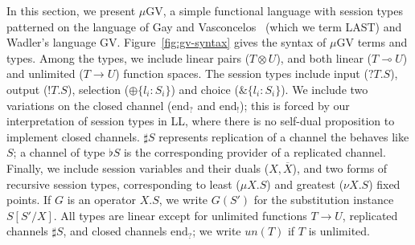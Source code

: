 \documentclass[orivec,envcountsame]{llncs}
\newcommand{\with}{\mathbin\binampersand}
\newcommand{\gvdual}[1]{\overline{#1}}
\newcommand{\gvout}[2]{{!#1.#2}}
\newcommand{\gvin}[2]{{?#1.#2}}
\newcommand{\lto}{\ensuremath{\multimap}}
\newcommand{\uto}{\ensuremath{\rightarrow}}
\newcommand{\outterm}{\mathrm{end}_!}
\newcommand{\interm}{\mathrm{end}_?}
\newcommand{\gvserver}[1]{\flat #1}
\newcommand{\gvservice}[1]{\sharp #1}
\newcommand{\mugv}{$\mu\mathrm{GV}$\xspace}
\begin{document}
In this section, we present \mugv, a simple functional language with session types patterned on the
language of Gay and Vasconcelos~\cite{GayVasconcelos10} (which we term LAST) and Wadler's language GV.
Figure~\ref{fig:gv-syntax} gives the syntax of \mugv terms and types.  Among the types, we include
linear pairs ($T \otimes U$), and both linear ($T \lto U$) and unlimited ($T \uto U$) function
spaces.  The session types include input ($\gvin{T}{S}$), output ($\gvout{T}{S}$), selection
($\oplus\{ l_i:S_i \}$) and choice ($\with\{l_i:S_i\}$).  We include two variations on the closed
channel ($\interm$ and $\outterm$); this is forced by our interpretation of session types in LL,
where there is no self-dual proposition to implement closed channels.  $\gvservice{S}$ represents
replication of a channel the behaves like $S$; a channel of type $\gvserver{S}$ is the corresponding
provider of a replicated channel.  Finally, we include session variables and their duals
($X,\gvdual{X}$), and two forms of recursive session types, corresponding to least ($\mu X.S$) and
greatest ($\nu X.S$) fixed points.  If $G$ is an operator $X.S$, we write $G(S')$ for the
substitution instance $S[S'/X]$.  All types are linear except for unlimited functions $T \uto U$,
replicated channels $\gvservice{S}$, and closed channels $\interm$; we write $un(T)$ if $T$ is
unlimited.
\end{document}
